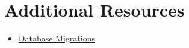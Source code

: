 \section{Additional Resources}

\begin{itemize}[leftmargin=*]
    \item \href{http://laravel.com/docs/master/migrations}{Database Migrations}
\end{itemize}

